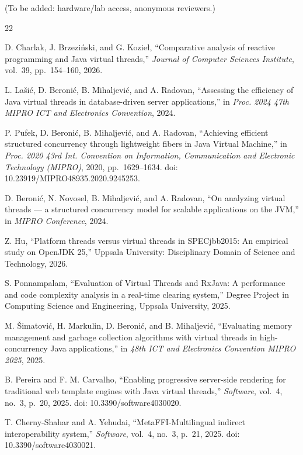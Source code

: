 \documentclass[10pt]{article}
\begin{document}
(To be added: hardware/lab access, anonymous reviewers.)

\begin{thebibliography}{22}

 D. Charlak, J. Brzeziński, and G. Kozieł, ``Comparative analysis of reactive programming and Java virtual threads,'' \emph{Journal of Computer Sciences Institute}, vol.~39, pp.~154--160, 2026.

 L. Lašić, D. Beronić, B. Mihaljević, and A. Radovan, ``Assessing the efficiency of Java virtual threads in database-driven server applications,'' in \emph{Proc. 2024 47th MIPRO ICT and Electronics Convention}, 2024.

 P. Pufek, D. Beronić, B. Mihaljević, and A. Radovan, ``Achieving efficient structured concurrency through lightweight fibers in Java Virtual Machine,'' in \emph{Proc. 2020 43rd Int. Convention on Information, Communication and Electronic Technology (MIPRO)}, 2020, pp.~1629--1634. doi: 10.23919/MIPRO48935.2020.9245253.

 D. Beronić, N. Novosel, B. Mihaljević, and A. Radovan, ``On analyzing virtual threads --- a structured concurrency model for scalable applications on the JVM,'' in \emph{MIPRO Conference}, 2024.

 Z. Hu, ``Platform threads versus virtual threads in SPECjbb2015: An empirical study on OpenJDK 25,'' Uppsala University: Disciplinary Domain of Science and Technology, 2026.

 S. Ponnampalam, ``Evaluation of Virtual Threads and RxJava: A performance and code complexity analysis in a real-time clearing system,'' Degree Project in Computing Science and Engineering, Uppsala University, 2025.

 M. Šimatović, H. Markulin, D. Beronić, and B. Mihaljević, ``Evaluating memory management and garbage collection algorithms with virtual threads in high-concurrency Java applications,'' in \emph{48th ICT and Electronics Convention MIPRO 2025}, 2025.

 B. Pereira and F. M. Carvalho, ``Enabling progressive server-side rendering for traditional web template engines with Java virtual threads,'' \emph{Software}, vol.~4, no.~3, p.~20, 2025. doi: 10.3390/software4030020.

 T. Cherny-Shahar and A. Yehudai, ``MetaFFI-Multilingual indirect interoperability system,'' \emph{Software}, vol.~4, no.~3, p.~21, 2025. doi: 10.3390/software4030021.


\end{thebibliography}
\end{document}
